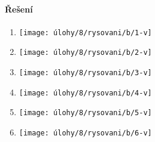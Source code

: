 \paragraph{Řešení}
\begin{enumerate}
    \item
    \begin{minipage}[t]{\linewidth}
        \begin{quote}
            \phantom{text}
        \end{quote}
        \centering
        \texttt{[image: úlohy/8/rysovani/b/1-v]}

    \end{minipage}

    \item
    \begin{minipage}[t]{\linewidth}
        \begin{quote}
            \phantom{text}
        \end{quote}
        \centering
        \texttt{[image: úlohy/8/rysovani/b/2-v]}

    \end{minipage}

    \item
    \begin{minipage}[t]{\linewidth}
        \begin{quote}
            \phantom{text}
        \end{quote}
        \centering
        \texttt{[image: úlohy/8/rysovani/b/3-v]}

    \end{minipage}

    \item
    \begin{minipage}[t]{\linewidth}
        \begin{quote}
            \phantom{text}
        \end{quote}
        \centering
        \texttt{[image: úlohy/8/rysovani/b/4-v]}

    \end{minipage}

    \item
    \begin{minipage}[t]{\linewidth}
        \begin{quote}
            \phantom{text}
        \end{quote}
        \centering
        \texttt{[image: úlohy/8/rysovani/b/5-v]}

    \end{minipage}

    \item
    \begin{minipage}[t]{\linewidth}
        \begin{quote}
            \phantom{text}
        \end{quote}
        \centering
        \texttt{[image: úlohy/8/rysovani/b/6-v]}

    \end{minipage}
\end{enumerate}

